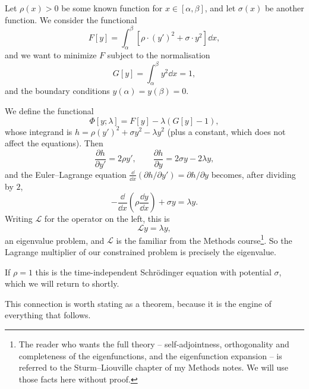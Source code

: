 \documentclass[a4paper]{scrartcl}
\begin{document}
\begin{example}
	Let $\rho(x) > 0$ be some known function for $x \in [\alpha, \beta]$, and let $\sigma(x)$ be another function. We consider the functional
	$$
	F[y] = \int_{\alpha}^{\beta} \left[\rho \cdot (y')^2 + \sigma \cdot y^2\right] \dd x,
	$$
	and we want to minimize $F$ subject to the normalisation
	$$
	G[y] = \int_\alpha^{\beta} y^2 \dd x = 1,
	$$
	and the boundary conditions $y(\alpha) = y(\beta) = 0$.

	We define the functional
	$$
	\Phi[y; \lambda] = F[y] - \lambda \left(G[y] - 1\right),
	$$
	whose integrand is $h = \rho (y')^2 + \sigma y^2 - \lambda y^2$ (plus a constant, which does not affect the equations). Then
	$$
	\frac{\partial h}{\partial y'} = 2\rho y', \qquad \frac{\partial h}{\partial y} = 2\sigma y - 2\lambda y,
	$$
	and the Euler--Lagrange equation $\frac{\dd}{\dd x}(\partial h/\partial y') = \partial h /\partial y$ becomes, after dividing by $2$,
	$$
	-\frac{\dd}{\dd x}\left(\rho \frac{\dd y}{\dd x}\right) + \sigma y = \lambda y.
	$$
	Writing $\mathcal{L}$ for the operator on the left, this is
	$$
	\mathcal{L}y = \lambda y,
	$$
	an eigenvalue problem, and $\mathcal{L}$ is the  familiar from the Methods course\footnote{The reader who wants the full theory -- self-adjointness, orthogonality and completeness of the eigenfunctions, and the eigenfunction expansion -- is referred to the Sturm--Liouville chapter of my Methods notes. We will use those facts here without proof.}. So the Lagrange multiplier of our constrained problem is precisely the eigenvalue.

	If $\rho = 1$ this is the time-independent Schr\"odinger equation with potential $\sigma$, which we will return to shortly.
\end{example}

This connection is worth stating as a theorem, because it is the engine of everything that follows.
\end{document}
